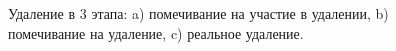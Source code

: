 \documentclass[12pt]{article}
\begin{document}
{\begin{figure}[h!]
					\begin{minipage}[h]{0.45\linewidth}
						\center {}
					\end{minipage}
					\hfill
					\begin{minipage}[h]{0.45\linewidth}
						\center {}
					\end{minipage}
					\vfill
					\begin{minipage}[h]{0.45\linewidth}
						\center {}
					\end{minipage}
					\caption{Удаление в 3 этапа: a) помечивание на участие в удалении, b) помечивание на удаление, c) реальное удаление.}
				\end{figure}
}
\end{document}
